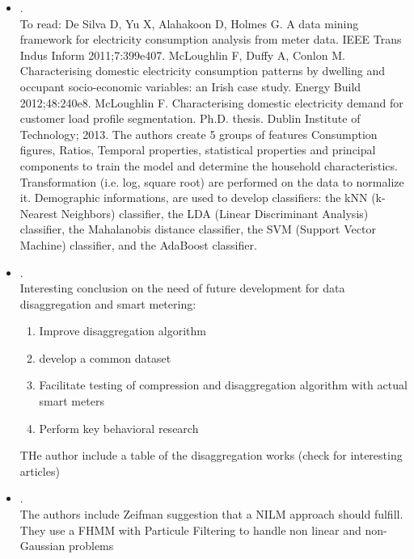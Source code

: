 \begin{itemize}
	\item {}.\\
	 To read: De Silva D, Yu X, Alahakoon D, Holmes G. A data mining framework for electricity consumption analysis from meter data. IEEE Trans Indus Inform 2011;7:399e407.
	 McLoughlin F, Duffy A, Conlon M. Characterising domestic electricity consumption patterns by dwelling and occupant socio-economic variables: an Irish case study. Energy Build 2012;48:240e8.
	 McLoughlin F. Characterising domestic electricity demand for customer load profile segmentation. Ph.D. thesis. Dublin Institute of Technology; 2013.
	 The authors create 5 groups of features Consumption figures, Ratios, Temporal properties, statistical properties and principal components to train the model and determine the household characteristics. Transformation (i.e. log, square root) are performed on the data to normalize it. Demographic informations, are used to develop classifiers: the kNN (k-Nearest Neighbors) classifier, the LDA (Linear Discriminant Analysis) classifier, the Mahalanobis distance classifier, the SVM (Support Vector Machine) classifier, and the AdaBoost classifier.
	\item {}.\\
	 Interesting conclusion on the need of future development for data disaggregation and smart metering:
	 \begin{enumerate}
	 \item Improve disaggregation algorithm
	 \item develop a common dataset
	 \item Facilitate testing of compression and disaggregation algorithm with actual smart meters
	 \item Perform key behavioral research
	 \end{enumerate}
	 THe author include a table of the disaggregation works (check for interesting articles)
	\item {}.\\
	 The authors include Zeifman suggestion that a NILM approach should fulfill.
	 They use a FHMM with Particule Filtering to handle non linear and non-Gaussian problems
\end{itemize}